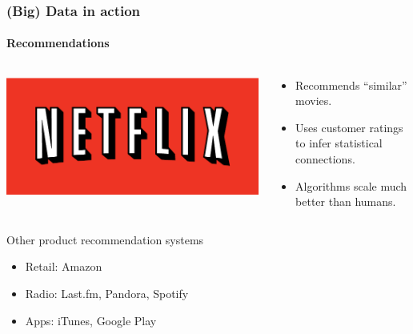 \begin{frame}
\frametitle{(Big) Data in action}
\framesubtitle{Recommendations}
\begin{center}

\begin{columns}

\begin{column}{0.3\textwidth}
\includegraphics[width=1\textwidth]{graphics/Netflix_logo.pdf}
\end{column}

\begin{column}{0.65\textwidth}
\begin{itemize}
\item Recommends ``similar'' movies.
\item Uses customer ratings to infer statistical connections.
\item Algorithms scale much better than humans.
\end{itemize}
\end{column}

\end{columns}

\bigskip
\bigskip

\begin{exampleblock}{Other product recommendation systems}
\begin{itemize}
	\item Retail: Amazon
	\item Radio: Last.fm, Pandora, Spotify
	\item Apps: iTunes, Google Play
\end{itemize}
\end{exampleblock}

\end{center}
\end{frame}


